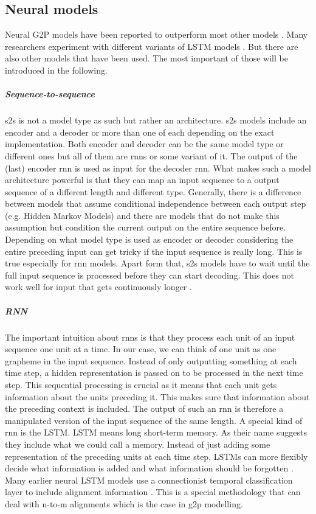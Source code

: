\subsection{Neural models}
Neural G2P models have been reported to outperform most other models \citep{Lee&Ashby.2020}. Many researchers experiment with different variants of LSTM models \citep{Lee&Ashby.2020, hammond-2021-data, gautam.2021, Rao2015GraphemetophonemeCU}. But there are also other models that have been used. The most important of those will be introduced in the following.

\subparagraph{Sequence-to-sequence}
\ac{s2s} is not a model type as such but rather an architecture. \ac{s2s} models include an encoder and a decoder or more than one of each depending on the exact implementation. Both encoder and decoder can be the same model type or different ones but all of them are \acp{rnn} or some variant of it. The output of the (last) encoder \ac{rnn} is used as input for the decoder \ac{rnn}. What makes such a model architecture powerful is that they can map an input sequence to a output sequence of a different length and different type. 
Generally, there is a difference between models that assume conditional independence between each output step (e.g. Hidden Markov Models) and there are models that do not make this assumption but condition the current output on the entire sequence before. Depending on what model type is used as encoder or decoder considering the entire preceding input can get tricky if the input sequence is really long. This is true especially for \ac{rnn} models. Apart form that, \ac{s2s} models have to wait until the full input sequence is processed before they can start decoding. This does not work well for input that gets continuously longer \citep{Kostadinov.2019, DBLP:journals/corr/SutskeverVL14}. 

\subparagraph{RNN}
The important intuition about \acp{rnn} is that they process each unit of an input sequence one unit at a time. In our case, we can think of one unit as one grapheme in the input sequence. Instead of only outputting something at each time step, a hidden representation is passed on to be processed in the next time step. This sequential processing is crucial as it means that each unit gets information about the units preceding it. This makes sure that information about the preceding context is included. The output of such an \ac{rnn} is therefore a manipulated version of the input sequence of the same length.
A special kind of \ac{rnn} is the LSTM. LSTM means long short-term memory. As their name suggests they include what we could call a memory. Instead of just adding some representation of the preceding units at each time step, LSTMs can more flexibly decide what information is added and what information should be forgotten \citep{Olah.29.01.2022, Kostadinov.2017}.
Many earlier neural LSTM models use a connectionist temporal classification layer to include alignment information \citep{lo-nicolai-2021-linguistic}. This is a special methodology that can deal with n-to-m alignments which is the case in \ac{g2p} modelling.

